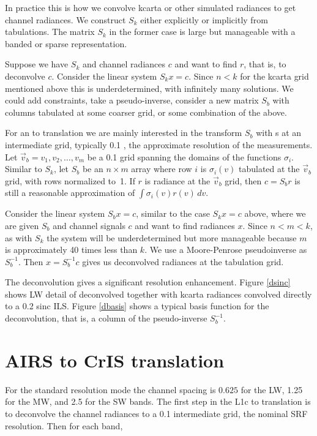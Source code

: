 \documentclass[12pt]{article}
\begin{document}
In practice this is how we convolve kcarta or other simulated
radiances to get {\airs} channel radiances.  We construct $S_k$
either explicitly or implicitly from {\airs} {\srf} tabulations.
The matrix $S_k$ in the former case is large but manageable with a
banded or sparse representation.

Suppose we have $S_k$ and channel radiances $c$ and want to 
find $r$, that is, to deconvolve $c$.  Consider the linear system
$S_k x = c$.  Since $n < k$ for the kcarta grid mentioned above this
is underdetermined, with infinitely many solutions.  We could add
constraints, take a pseudo-inverse, consider a new matrix $S_b$ with
columns tabulated at some coarser grid, or some combination of the
above.

For an {\airs} to {\cris} translation we are mainly interested in 
the transform $S_b$ with {\srf}s at an intermediate grid, typically
0.1 {\wn}, the approximate resolution of the {\srf} measurements.
Let $\vec v_b = v_1,v_2,\ldots,v_m$ be a 0.1 {\wn} grid spanning the
domains of the functions $\sigma_i$.  Similar to $S_k$, let $S_b$ be
an $n\times m$ array where row $i$ is $\sigma_i(v)$ tabulated at the
$\vec v_b$ grid, with rows normalized to~1.  If $r$ is radiance at
the $\vec v_b$ grid, then $c = S_b r$ is still a reasonable
approximation of $\int\sigma_i(v)r(v)\,dv$.

Consider the linear system $S_b x = c$, similar to the case 
$S_k x = c$ above, where we are given $S_b$ and channel signals $c$
and want to find radiances $x$.  Since $n < m < k$, as with $S_k$
the system will be underdetermined but more manageable because $m$
is approximately 40 times less than $k$.  We use a Moore-Penrose
pseudoinverse as $S_b^{-1}$.  Then $x = S_b^{-1} c$ gives us
deconvolved radiances at the {\srf} tabulation grid. 

The {\airs} deconvolution gives a significant resolution enhancement.
Figure \ref{dsinc} shows LW detail of deconvolved {\airs} together
with kcarta radiances convolved directly to a 0.2 {\wn} sinc ILS.
Figure \ref{dbasis} shows a typical basis function for the {\airs}
deconvolution, that is, a column of the pseudo-inverse $S_b^{-1}$.

\FloatBarrier
\section{AIRS to CrIS translation}
\label{airs2cris}

For the {\cris} standard resolution mode the channel spacing is
$0.625$ {\wn} for the LW, 1.25 {\wn} for the MW, and 2.5 {\wn} for
the SW bands.  The first step in the {\airs} L1c to {\cris}
translation is to deconvolve the {\airs} channel radiances to a 0.1
{\wn} intermediate grid, the nominal {\airs} SRF resolution.  Then
for each {\cris} band,
\end{document}

